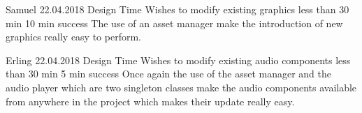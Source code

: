 {Samuel}
{22.04.2018}
{Design Time}
{Wishes to modify existing graphics}
{less than 30 min}
{10 min}
{success}
{The use of an asset manager make the introduction of new graphics really easy to perform.}

{Erling}
{22.04.2018}
{Design Time}
{Wishes to modify existing audio components}
{less than 30 min}
{5 min}
{success}
{Once again the use of the asset manager and the audio player which are two singleton classes make the audio components available from anywhere in the project which makes their update really easy.}

%
%
%
%
%
%
%
%
%

